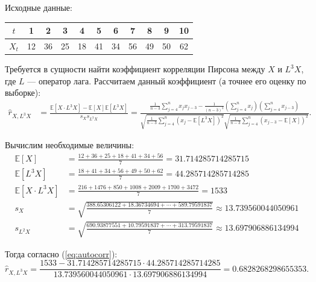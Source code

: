 \documentclass[12pt, a4paper]{extarticle}
\newcommand{\Sum}[2]{\sum\limits_{#1}^{#2}}
\begin{document}
Исходные данные:
\begin{table}[h!]
    \centering
    \begin{tabular}{|c|c|c|c|c|c|c|c|c|c|c|}
        \hline
        $t$ & 1 & 2 & 3 & 4 & 5 & 6 & 7 & 8 & 9 & 10 \\
        \hline
        $X_t$ & 12 & 36 & 25 & 18 & 41 & 34 & 56 & 49 & 50 & 62 \\
        \hline
    \end{tabular}
\end{table}

Требуется в сущности найти коэффициент корреляции Пирсона между $X$ и $L^3 X$, где $L$ --- оператор лага.
Рассчитаем данный коэффициент (а точнее его оценку по выборке):
\begin{equation}
\begin{split}
    \hat{r}_{X, L^3 X} 
    & = \frac{\mathbb{E}[X\cdot L^3 X] - \mathbb{E}[X]\mathbb{E}[L^3 X]}{s_{X} s_{L^3X}} = 
        \frac{\frac{1}{n - 3}\Sum{j = 4}{n}x_j x_{j - 3} - 
        \frac{1}{(n - 3) ^ 2}\left(\Sum{j = 4}{n}x_j\right)\left(\Sum{j = 4}{n}x_{j - 3}\right)}
        {\sqrt{\frac{1}{n - 3}\Sum{j = 4}{n}\left(x_j - \mathbb{E}[L^3 X]\right) ^ 2} 
        \sqrt{\frac{1}{n - 3}\Sum{j = 4}{n}\left(x_{j - 3} - \mathbb{E}[X]\right) ^ 2}}.
\end{split}
\label{eq:autocorr}
\end{equation}

Вычислим необходимые величины:
\begin{equation*}
\begin{split}
    \mathbb{E}[X] & = \frac{12 + 36 + 25 + 18 + 41 + 34 + 56}{7} = 31.714285714285715 \\
    \mathbb{E}[L^3 X] & = \frac{18 + 41 + 34 + 56 + 49 + 50 + 62}{7} = 44.285714285714285 \\
    \mathbb{E}[X\cdot L^3 X] & = \frac{216 + 1476 +  850 + 1008 + 2009 + 1700 + 3472}{7} = 1533 \\
    s_{X} & = \sqrt{\frac{388.65306122 + 18.36734694 + \cdots + 
        589.79591837}{7}} \approx 13.739560044050961 \\
    s_{L^2X} &= \sqrt{\frac{690.93877551 + 10.79591837 + \cdots + 
        313.79591837}{7}} \approx 13.697906886134994
\end{split}
\end{equation*}

Тогда согласно (\ref{eq:autocorr}):
\begin{equation}
    \hat{r}_{X, L^3 X} = \frac{1533 - 31.714285714285715 \cdot 44.285714285714285}{
        13.739560044050961 \cdot 13.697906886134994} = 0.6828268298655353.
\end{equation}
\end{document}
